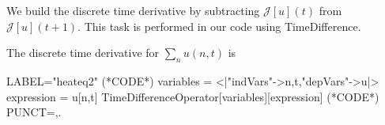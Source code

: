 \documentclass[runningheads]{llncs}
\newcommand{\1}{\chi}
\begin{document}
We build the discrete time derivative by subtracting $\mathcal{J}[u](t)$ from $\mathcal{J}[u](t+1)$. This task is performed in our code using {\sc TimeDifference}.
\begin{example}
	The discrete time derivative for $\sum_n u(n,t)$ is
	\begin{EXE}
		LABEL="heateq2"
		(*CODE*)
		variables = <|"indVars"->{n,t},"depVars"->{u}|>
		expression = u[n,t]
		TimeDifferenceOperator[variables][expression]
		(*CODE*)
		PUNCT={,.}
	\end{EXE}
	
	\begin{small}
		
		
	\end{small}
\end{example}
	
\end{document}
